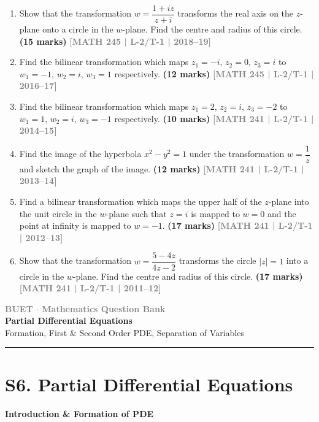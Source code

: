 \documentclass[12pt,a4paper]{article}
\newcommand{\yr}[1]{\hfill\textcolor{gray}{\small\textbf{[#1]}}}
\newcommand{\mk}[1]{\textcolor{orange!70!black}{\small\textbf{(#1 marks)}}}
\newcommand{\subtopic}[2]{%
  \vspace{10pt}
  \noindent\begin{tcolorbox}[colback=#1!8,colframe=#1,boxrule=0.6pt,arc=4pt,
    left=6pt,right=6pt,top=4pt,bottom=4pt]
    \small\bfseries\textcolor{#1}{#2}
  \end{tcolorbox}
  \vspace{2pt}
}
\newcommand{\secdivider}[3]{%
  \newpage\thispagestyle{empty}%
  \vspace*{\fill}%
  \begin{tcolorbox}[enhanced,colback=#3!6,colframe=#3,boxrule=1.5pt,arc=8pt,
    left=20pt,right=20pt,top=22pt,bottom=22pt,
    shadow={3pt}{-3pt}{0pt}{black!15}]
    \centering
    {\large\textcolor{gray}{\textbf{BUET $\cdot$ Mathematics Question Bank}}}\\[8pt]
    {\fontsize{26}{32}\selectfont\bfseries\textcolor{#3}{#1}}\\[6pt]
    {\fontsize{15}{19}\selectfont\textcolor{dgray}{#2}}\\[12pt]
    \textcolor{#3!60}{\rule{0.5\textwidth}{0.5pt}}
  \end{tcolorbox}%
  \vspace*{\fill}\newpage%
}
\begin{document}
\begin{enumerate}\item Show that the transformation $w=\dfrac{1+iz}{z+i}$ transforms the real axis on the $z$-plane onto a circle in the $w$-plane. Find the centre and radius of this circle.
\mk{15} \yr{MATH 245 | L-2/T-1 | 2018--19}

\item Find the bilinear transformation which maps $z_{1}=-i,\,z_{2}=0,\,z_{3}=i$ to $w_{1}=-1,\,w_{2}=i,\,w_{3}=1$ respectively.
\mk{12} \yr{MATH 245 | L-2/T-1 | 2016--17}

\item Find the bilinear transformation which maps $z_{1}=2,\,z_{2}=i,\,z_{3}=-2$ to $w_{1}=1,\,w_{2}=i,\,w_{3}=-1$ respectively.
\mk{10} \yr{MATH 241 | L-2/T-1 | 2014--15}

\item Find the image of the hyperbola $x^{2}-y^{2}=1$ under the transformation $w=\dfrac{1}{z}$ and sketch the graph of the image.
\mk{12} \yr{MATH 241 | L-2/T-1 | 2013--14}

\item Find a bilinear transformation which maps the upper half of the $z$-plane into the unit circle in the $w$-plane such that $z=i$ is mapped to $w=0$ and the point at infinity is mapped to $w=-1$.
\mk{17} \yr{MATH 241 | L-2/T-1 | 2012--13}

\item Show that the transformation $w=\dfrac{5-4z}{4z-2}$ transforms the circle $|z|=1$ into a circle in the $w$-plane. Find the centre and radius of this circle.
\mk{17} \yr{MATH 241 | L-2/T-1 | 2011--12}

\end{enumerate}


\secdivider{Partial Differential Equations}{Formation, First \& Second Order PDE, Separation of Variables}{cF}

\section{S6. Partial Differential Equations}
\label{sec:S6}

\subtopic{cF}{Introduction \& Formation of PDE}
\label{sub:s6-formation}
\end{document}
